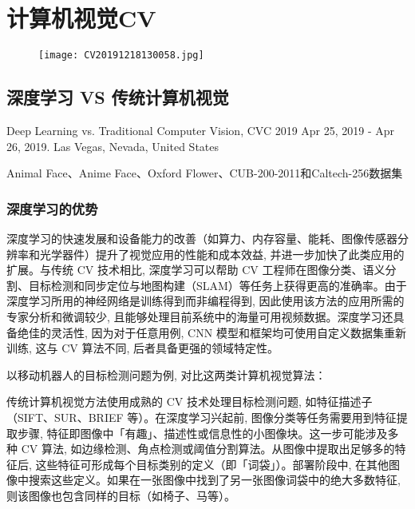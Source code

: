 \chapter{计算机视觉CV}\label{AIChapter11}
\begin{figure}[H]
\centering
\texttt{[image: CV20191218130058.jpg]}
\label{CV20191218130058}
\end{figure}
\newpage
\section{深度学习 VS 传统计算机视觉}
Deep Learning vs. Traditional Computer Vision, CVC 2019  Apr 25, 2019 - Apr 26, 2019. Las Vegas, Nevada, United States \cite{MahonyCVC2019}

Animal Face、Anime Face、Oxford Flower、CUB-200-2011和Caltech-256数据集


\subsection{深度学习的优势}

深度学习的快速发展和设备能力的改善（如算力、内存容量、能耗、图像传感器分辨率和光学器件）提升了视觉应用的性能和成本效益, 并进一步加快了此类应用的扩展。与传统 CV 技术相比, 深度学习可以帮助 CV 工程师在图像分类、语义分割、目标检测和同步定位与地图构建（SLAM）等任务上获得更高的准确率。由于深度学习所用的神经网络是训练得到而非编程得到, 因此使用该方法的应用所需的专家分析和微调较少, 且能够处理目前系统中的海量可用视频数据。深度学习还具备绝佳的灵活性, 因为对于任意用例, CNN 模型和框架均可使用自定义数据集重新训练, 这与 CV 算法不同, 后者具备更强的领域特定性。

以移动机器人的目标检测问题为例, 对比这两类计算机视觉算法：

传统计算机视觉方法使用成熟的 CV 技术处理目标检测问题, 如特征描述子（SIFT、SUR、BRIEF 等）。在深度学习兴起前, 图像分类等任务需要用到特征提取步骤, 特征即图像中「有趣」、描述性或信息性的小图像块。这一步可能涉及多种 CV 算法, 如边缘检测、角点检测或阈值分割算法。从图像中提取出足够多的特征后, 这些特征可形成每个目标类别的定义（即「词袋」）。部署阶段中, 在其他图像中搜索这些定义。如果在一张图像中找到了另一张图像词袋中的绝大多数特征, 则该图像也包含同样的目标（如椅子、马等）。

